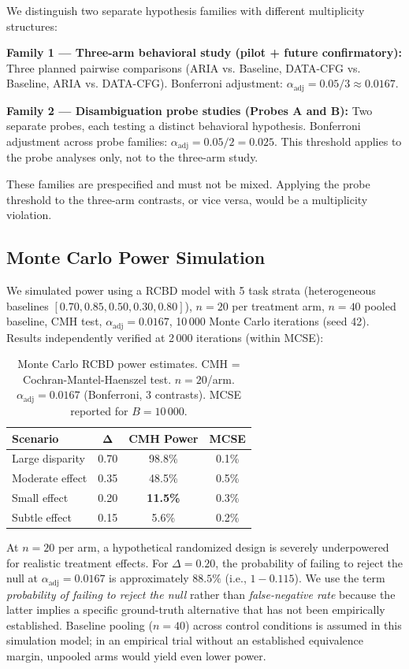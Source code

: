 \documentclass[conference]{IEEEtran}
\begin{document}
We distinguish two separate hypothesis families with different multiplicity structures:

\textbf{Family 1 --- Three-arm behavioral study (pilot + future confirmatory):} Three planned pairwise comparisons (ARIA vs. Baseline, DATA-CFG vs. Baseline, ARIA vs. DATA-CFG). Bonferroni adjustment: $\alpha_{\mathrm{adj}} = 0.05/3 \approx 0.0167$.

\textbf{Family 2 --- Disambiguation probe studies (Probes A and B):} Two separate probes, each testing a distinct behavioral hypothesis. Bonferroni adjustment across probe families: $\alpha_{\mathrm{adj}} = 0.05/2 = 0.025$. This threshold applies to the probe analyses only, not to the three-arm study.

These families are prespecified and must not be mixed. Applying the probe threshold to the three-arm contrasts, or vice versa, would be a multiplicity violation.

\subsection{Monte Carlo Power Simulation}

We simulated power using a RCBD model with 5 task strata (heterogeneous baselines $[0.70, 0.85, 0.50, 0.30, 0.80]$), $n=20$ per treatment arm, $n=40$ pooled baseline, CMH test, $\alpha_{\mathrm{adj}}=0.0167$, 10\,000 Monte Carlo iterations (seed 42). Results independently verified at 2\,000 iterations (within MCSE):

\begin{table}[t]
\centering
\footnotesize
\caption{Monte Carlo RCBD power estimates. CMH = Cochran-Mantel-Haenszel test. $n=20$/arm. $\alpha_{\mathrm{adj}}=0.0167$ (Bonferroni, 3 contrasts). MCSE reported for $B=10\,000$.}
\label{tab:power}
\begin{tabular}{lccc}
\toprule
\textbf{Scenario} & $\boldsymbol{\Delta}$ & \textbf{CMH Power} & \textbf{MCSE} \\
\midrule
Large disparity   & 0.70 & 98.8\% & 0.1\% \\
Moderate effect   & 0.35 & 48.5\% & 0.5\% \\
Small effect      & 0.20 & \textbf{11.5\%} & 0.3\% \\
Subtle effect     & 0.15 & 5.6\%  & 0.2\% \\
\bottomrule
\end{tabular}
\end{table}

At $n=20$ per arm, a hypothetical randomized design is severely underpowered for realistic treatment effects. For $\Delta=0.20$, the probability of failing to reject the null at $\alpha_{\mathrm{adj}}=0.0167$ is approximately $88.5\%$ (i.e., $1 - 0.115$). We use the term \emph{probability of failing to reject the null} rather than \emph{false-negative rate} because the latter implies a specific ground-truth alternative that has not been empirically established. Baseline pooling ($n=40$) across control conditions is assumed in this simulation model; in an empirical trial without an established equivalence margin, unpooled arms would yield even lower power.
\end{document}
